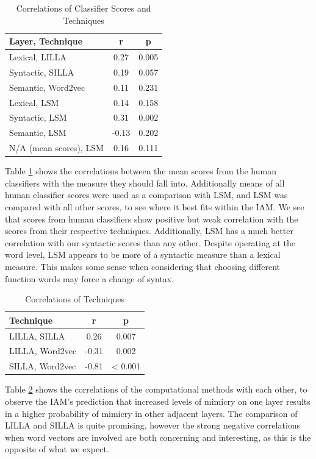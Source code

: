 \documentclass[conference]{IEEEtran}
\begin{document}
\begin{table}[!t]
\caption{Correlations of Classifier Scores and Techniques}
\label{scores_techniques}
\centering
\renewcommand{\arraystretch}{1.2}
\begin{tabular}{l c c}
Layer, Technique & r & p \\
\hline
Lexical, LILLA & 0.27 & 0.005 \\
Syntactic, SILLA & 0.19 & 0.057 \\
Semantic, Word2vec & 0.11 & 0.231 \\
Lexical, LSM & 0.14 & 0.158 \\
Syntactic, LSM & 0.31 & 0.002 \\
Semantic, LSM & -0.13 & 0.202 \\
N/A (mean scores), LSM & 0.16 & 0.111
\end{tabular}
\end{table}

Table \ref{scores_techniques} shows the correlations between the mean scores from the human classifiers with the measure they should fall into.  Additionally means of all human classifier scores were used as a comparison with LSM, and LSM was compared with all other scores, to see where it best fits within the IAM. We see that scores from human classifiers show positive but weak correlation with the scores from their respective techniques. Additionally, LSM has a much better correlation with our syntactic scores than any other. Despite operating at the word level, LSM appears to be more of a syntactic measure than a lexical measure. This makes some sense when considering that choosing different function words may force a change of syntax.

\begin{table}[!t]
\caption{Correlations of Techniques}
\label{techniques}
\centering
\renewcommand{\arraystretch}{1.2}
\begin{tabular}{l c c}
Technique & r & p \\
\hline
LILLA, SILLA & 0.26 & 0.007 \\
LILLA, Word2vec & -0.31 & 0.002 \\
SILLA, Word2vec & -0.81 & < 0.001
\end{tabular}
\end{table}

Table \ref{techniques} shows the correlations of the computational methods with each other, to observe the IAM's prediction that increased levels of mimicry on one layer results in a higher probability of mimicry in other adjacent layers. The comparison of LILLA and SILLA is quite promising, however the strong negative correlations when word vectors are involved are both concerning and interesting, as this is the opposite of what we expect.
\end{document}
